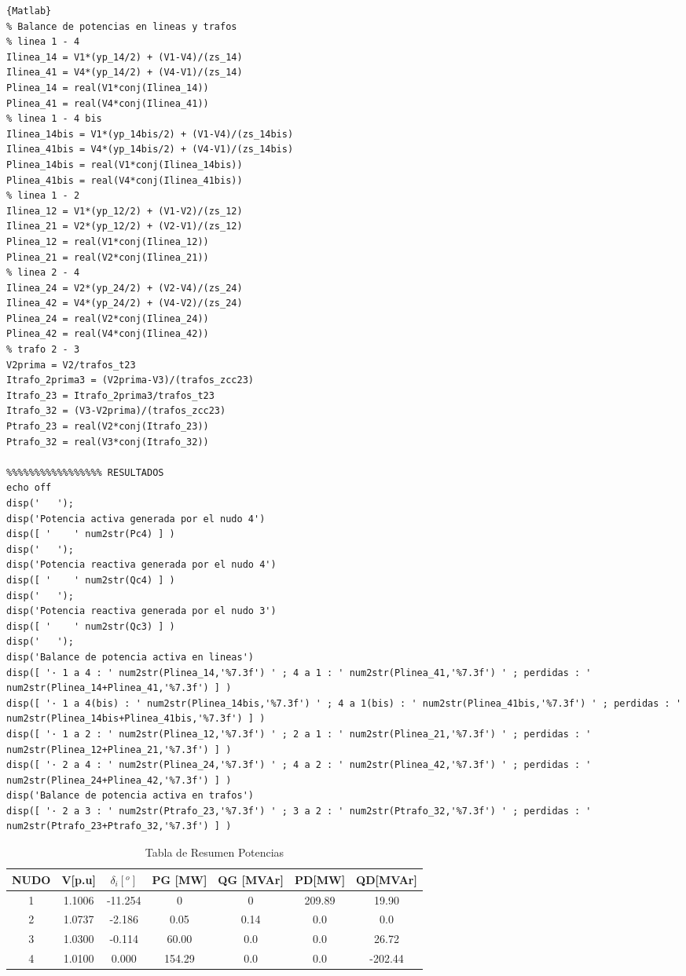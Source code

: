 \documentclass[a4paper,10pt,titlepage,oneside]{article}
\begin{document}
{\begin{lstlisting}[frame=lines]{Matlab}
% Balance de potencias en lineas y trafos
% linea 1 - 4
Ilinea_14 = V1*(yp_14/2) + (V1-V4)/(zs_14)
Ilinea_41 = V4*(yp_14/2) + (V4-V1)/(zs_14)
Plinea_14 = real(V1*conj(Ilinea_14))
Plinea_41 = real(V4*conj(Ilinea_41))
% linea 1 - 4 bis
Ilinea_14bis = V1*(yp_14bis/2) + (V1-V4)/(zs_14bis)
Ilinea_41bis = V4*(yp_14bis/2) + (V4-V1)/(zs_14bis)
Plinea_14bis = real(V1*conj(Ilinea_14bis))
Plinea_41bis = real(V4*conj(Ilinea_41bis))
% linea 1 - 2
Ilinea_12 = V1*(yp_12/2) + (V1-V2)/(zs_12)
Ilinea_21 = V2*(yp_12/2) + (V2-V1)/(zs_12)
Plinea_12 = real(V1*conj(Ilinea_12))
Plinea_21 = real(V2*conj(Ilinea_21))
% linea 2 - 4
Ilinea_24 = V2*(yp_24/2) + (V2-V4)/(zs_24)
Ilinea_42 = V4*(yp_24/2) + (V4-V2)/(zs_24)
Plinea_24 = real(V2*conj(Ilinea_24))
Plinea_42 = real(V4*conj(Ilinea_42))
% trafo 2 - 3
V2prima = V2/trafos_t23
Itrafo_2prima3 = (V2prima-V3)/(trafos_zcc23)
Itrafo_23 = Itrafo_2prima3/trafos_t23
Itrafo_32 = (V3-V2prima)/(trafos_zcc23)
Ptrafo_23 = real(V2*conj(Itrafo_23))
Ptrafo_32 = real(V3*conj(Itrafo_32))

%%%%%%%%%%%%%%%%% RESULTADOS
echo off
disp('   ');
disp('Potencia activa generada por el nudo 4')
disp([ '    ' num2str(Pc4) ] )
disp('   ');
disp('Potencia reactiva generada por el nudo 4')
disp([ '    ' num2str(Qc4) ] )
disp('   ');
disp('Potencia reactiva generada por el nudo 3')
disp([ '    ' num2str(Qc3) ] )
disp('   ');
disp('Balance de potencia activa en lineas')
disp([ '· 1 a 4 : ' num2str(Plinea_14,'%7.3f') ' ; 4 a 1 : ' num2str(Plinea_41,'%7.3f') ' ; perdidas : ' num2str(Plinea_14+Plinea_41,'%7.3f') ] )
disp([ '· 1 a 4(bis) : ' num2str(Plinea_14bis,'%7.3f') ' ; 4 a 1(bis) : ' num2str(Plinea_41bis,'%7.3f') ' ; perdidas : ' num2str(Plinea_14bis+Plinea_41bis,'%7.3f') ] )
disp([ '· 1 a 2 : ' num2str(Plinea_12,'%7.3f') ' ; 2 a 1 : ' num2str(Plinea_21,'%7.3f') ' ; perdidas : ' num2str(Plinea_12+Plinea_21,'%7.3f') ] )
disp([ '· 2 a 4 : ' num2str(Plinea_24,'%7.3f') ' ; 4 a 2 : ' num2str(Plinea_42,'%7.3f') ' ; perdidas : ' num2str(Plinea_24+Plinea_42,'%7.3f') ] )
disp('Balance de potencia activa en trafos')
disp([ '· 2 a 3 : ' num2str(Ptrafo_23,'%7.3f') ' ; 3 a 2 : ' num2str(Ptrafo_32,'%7.3f') ' ; perdidas : ' num2str(Ptrafo_23+Ptrafo_32,'%7.3f') ] )
\end{lstlisting}
\begin{table}[htbp]
        \centering
        \begin{tabular}[t]{c c c c c c c}
        \textbf{NUDO} & V[p.u]&$\delta_i [^o]$&PG [MW]&QG [MVAr]&PD[MW]&QD[MVAr]\\
        \hline
        \rowcolor[gray]{0.8} 1 & 1.1006 & -11.254 & 0 & 0 & 209.89 & 19.90 \\
        \hline
        \rowcolor[gray]{0.6} 2 & 1.0737 & -2.186  & 0.05 & 0.14 & 0.0 & 0.0\\
        \hline
        \rowcolor[gray]{0.8} 3 & 1.0300 &  -0.114 & 60.00 & 0.0 & 0.0 & 26.72\\
        \hline
        \rowcolor[gray]{0.6} 4 & 1.0100 & 0.000 & 154.29 & 0.0 & 0.0& -202.44\\
        \hline
        \end{tabular}
 \caption{Tabla de Resumen Potencias}
 

\end{table}}
\end{document}
